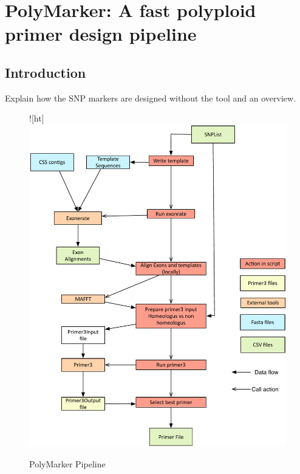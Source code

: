 
\chapter{PolyMarker: A fast polyploid primer design pipeline}
\section{Introduction} 
Explain how the SNP markers are designed without the tool and an overview. 


\begin{figure}![ht]
\includegraphics[width=1\textwidth]{PolyMarker/Figures/pipeline.pdf}
        \caption{PolyMarker Pipeline}
        \label{fig:poly:pipeline}
\end{figure}


